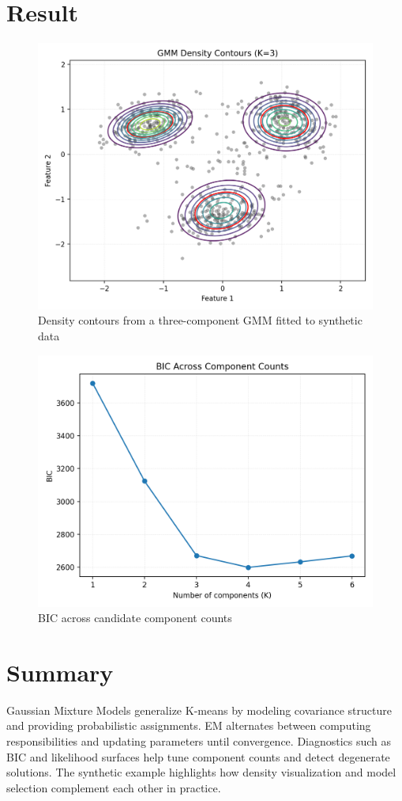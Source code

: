 ﻿\documentclass[12pt]{article}
\begin{document}
\section{Result}
\begin{figure}[H]
  \centering
  \includegraphics[width=0.82\linewidth]{gmm_density_contours.png}
  \caption{Density contours from a three-component GMM fitted to synthetic data}
  \label{fig:gmm_density_contours}
\end{figure}

\begin{figure}[H]
  \centering
  \includegraphics[width=0.8\linewidth]{gmm_bic_curve.png}
  \caption{BIC across candidate component counts}
  \label{fig:gmm_bic_curve}
\end{figure}

\FloatBarrier
\section{Summary}
Gaussian Mixture Models generalize K-means by modeling covariance structure and providing probabilistic assignments. EM alternates between computing responsibilities and updating parameters until convergence. Diagnostics such as BIC and likelihood surfaces help tune component counts and detect degenerate solutions. The synthetic example highlights how density visualization and model selection complement each other in practice.
\end{document}
